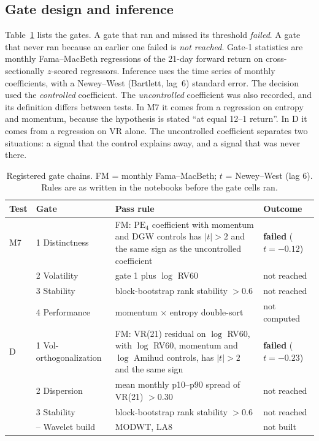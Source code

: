 \documentclass[11pt]{article}
\begin{document}
\subsection{Gate design and inference}

Table~\ref{tab:gates} lists the gates. A gate that ran and missed its threshold
\emph{failed}. A gate that never ran because an earlier one failed is \emph{not
reached}. Gate-1 statistics are monthly Fama--MacBeth regressions of the 21-day forward
return on cross-sectionally $z$-scored regressors. Inference uses the time series of
monthly coefficients, with a Newey--West (Bartlett, lag~6) standard error. The decision
used the \emph{controlled} coefficient. The \emph{uncontrolled} coefficient was also
recorded, and its definition differs between tests. In M7 it comes from a regression on
entropy and momentum, because the hypothesis is stated ``at equal 12--1 return''. In D it
comes from a regression on VR alone. The uncontrolled coefficient separates two
situations: a signal that the control explains away, and a signal that was never there.

\begin{table}[t]
\centering\small
\caption{Registered gate chains. FM = monthly Fama--MacBeth; $t$ = Newey--West (lag 6).
Rules are as written in the notebooks before the gate cells ran.}
\label{tab:gates}
\begin{tabularx}{\textwidth}{@{}l l X l@{}}
\toprule
Test & Gate & Pass rule & Outcome \\
\midrule
M7 & 1 Distinctness & FM: $\mathrm{PE}_4$ coefficient with momentum and DGW controls has $|t|>2$ and the same sign as the uncontrolled coefficient & \textbf{failed} ($t=-0.12$) \\
   & 2 Volatility & gate 1 plus $\log$ RV60 & not reached \\
   & 3 Stability & block-bootstrap rank stability $>0.6$ & not reached \\
   & 4 Performance & momentum $\times$ entropy double-sort & not computed \\
\addlinespace
D  & 1 Vol-orthogonalization & FM: VR(21) residual on $\log$ RV60, with $\log$ RV60, momentum and $\log$ Amihud controls, has $|t|>2$ and the same sign & \textbf{failed} ($t=-0.23$) \\
   & 2 Dispersion & mean monthly p10--p90 spread of VR(21) $>0.30$ & not reached \\
   & 3 Stability & block-bootstrap rank stability $>0.6$ & not reached \\
   & -- Wavelet build & MODWT, LA8 & not built \\
\bottomrule
\end{tabularx}
\end{table}
\end{document}
